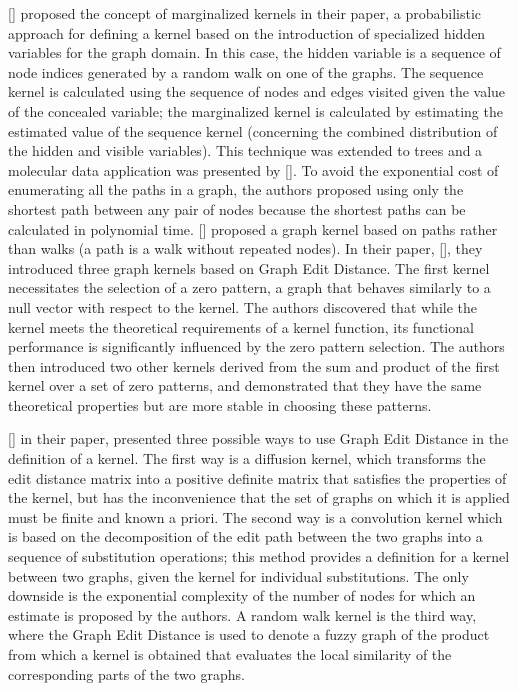 [\cite{Kashima:2003}] proposed the concept of marginalized kernels in their paper, a probabilistic approach for defining a kernel based on the introduction of specialized hidden variables for the graph domain. In this case, the hidden variable is a sequence of node indices generated by a random walk on one of the graphs. The sequence kernel is calculated using the sequence of nodes and edges visited given the value of the concealed variable; the marginalized kernel is calculated by estimating the estimated value of the sequence kernel (concerning the combined distribution of the hidden and visible variables). This technique was extended to trees and a molecular data application was presented by [\cite{Mahe:2009}]. To avoid the exponential cost of enumerating all the paths in a graph, the authors proposed using only the shortest path between any pair of nodes because the shortest paths can be calculated in polynomial time. [\cite{Karsten:2005}] proposed a graph kernel based on paths rather than walks (a path is a walk without repeated nodes). In their paper, [\cite{Neuhaus:2006}], they introduced three graph kernels based on Graph Edit Distance. The first kernel necessitates the selection of a zero pattern, a graph that behaves similarly to a null vector with respect to the kernel. The authors discovered that while the kernel meets the theoretical requirements of a kernel function, its functional performance is significantly influenced by the zero pattern selection. The authors then introduced two other kernels derived from the sum and product of the first kernel over a set of zero patterns, and demonstrated that they have the same theoretical properties but are more stable in choosing these patterns.

[\cite{Neuhaus:2009}] in their paper,  presented three possible ways to use Graph Edit Distance in the definition of a kernel. The first way is a diffusion kernel, which transforms the edit distance matrix into a positive definite matrix that satisfies the properties of the kernel, but has the inconvenience that the set of graphs on which it is applied must be finite and known a priori. The second way is a convolution kernel which is based on the decomposition of the edit path between the two graphs into a sequence of substitution operations; this method provides a definition for a kernel between two graphs, given the kernel for individual substitutions. The only downside is the exponential complexity of the number of nodes for which an estimate is proposed by the authors. A random walk kernel is the third way, where the Graph Edit Distance is used to denote a fuzzy graph of the product from which a kernel is obtained that evaluates the local similarity of the corresponding parts of the two graphs.

